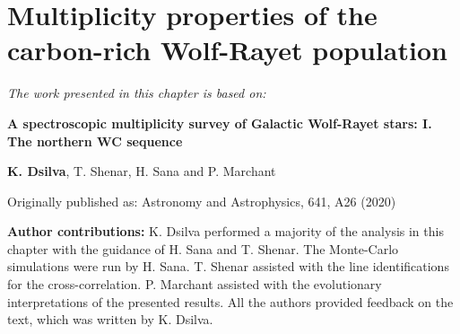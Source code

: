 \chapter{Multiplicity properties of the carbon-rich Wolf-Rayet population} \label{ch:wc}

\textit{The work presented in this chapter is based on:}

\textbf{A spectroscopic multiplicity survey of Galactic Wolf-Rayet stars: I. The northern WC sequence}

\textbf{K. Dsilva}, T. Shenar, H. Sana and P. Marchant

Originally published as: \newline
{\sc Astronomy and Astrophysics}, 641, A26 (2020)

\textbf{Author contributions:} K. Dsilva performed a majority of the analysis in this chapter with the guidance of H. Sana and T. Shenar. The Monte-Carlo simulations were run by H. Sana. T. Shenar assisted with the line identifications for the cross-correlation. P. Marchant assisted with the evolutionary interpretations of the presented results. All the authors provided feedback on the text, which was written by K. Dsilva.

